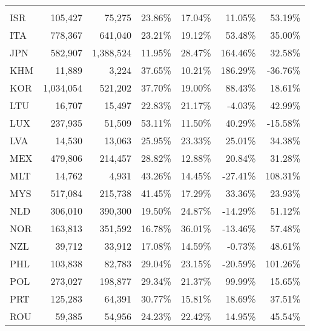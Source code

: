 \documentclass[a4paper,11pt]{article}
\begin{document}
\vspace*{\fill}
\begin{table}[h]\small
  \centering
    \hspace*{-1.1cm}
    \begin{tabular}{lrrrrrr}
    \multicolumn{1}{l}{\phantom{ISO3}} & \multicolumn{1}{c}{\phantom{fvax value}} & \multicolumn{1}{c}{\phantom{dvar value}} & \multicolumn{1}{c}{\phantom{fvax share}} & \multicolumn{1}{c}{\phantom{dvar share}} & \multicolumn{1}{c}{\phantom{$\Delta$ 95-11 (fvax)}} & \multicolumn{1}{c}{\phantom{$\Delta$ 95-11  (dvar)}} \\
    ISR   & 105,427 & 75,275 & 23.86\% & 17.04\% & 11.05\% & 53.19\% \\
    ITA   & 778,367 & 641,040 & 23.21\% & 19.12\% & 53.48\% & 35.00\% \\
    JPN   & 582,907 & 1,388,524 & 11.95\% & 28.47\% & 164.46\% & 32.58\% \\
    KHM   & 11,889 & 3,224 & 37.65\% & 10.21\% & 186.29\% & -36.76\% \\
    KOR   & 1,034,054 & 521,202 & 37.70\% & 19.00\% & 88.43\% & 18.61\% \\
    LTU   & 16,707 & 15,497 & 22.83\% & 21.17\% & -4.03\% & 42.99\% \\
    LUX   & 237,935 & 51,509 & 53.11\% & 11.50\% & 40.29\% & -15.58\% \\
    LVA   & 14,530 & 13,063 & 25.95\% & 23.33\% & 25.01\% & 34.38\% \\
    MEX   & 479,806 & 214,457 & 28.82\% & 12.88\% & 20.84\% & 31.28\% \\
    MLT   & 14,762 & 4,931 & 43.26\% & 14.45\% & -27.41\% & 108.31\% \\
    MYS   & 517,084 & 215,738 & 41.45\% & 17.29\% & 33.36\% & 23.93\% \\
    NLD   & 306,010 & 390,300 & 19.50\% & 24.87\% & -14.29\% & 51.12\% \\
    NOR   & 163,813 & 351,592 & 16.78\% & 36.01\% & -13.46\% & 57.48\% \\
    NZL   & 39,712 & 33,912 & 17.08\% & 14.59\% & -0.73\% & 48.61\% \\
    PHL   & 103,838 & 82,783 & 29.04\% & 23.15\% & -20.59\% & 101.26\% \\
    POL   & 273,027 & 198,877 & 29.34\% & 21.37\% & 99.99\% & 15.65\% \\
    PRT   & 125,283 & 64,391 & 30.77\% & 15.81\% & 18.69\% & 37.51\% \\
    ROU   & 59,385 & 54,956 & 24.23\% & 22.42\% & 14.95\% & 45.54\% \\

\end{tabular}
\end{table}
\end{document}

